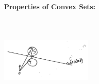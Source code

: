 \vspace{0.5cm}
\textbf{Properties of Convex Sets:}
\begin{marginfigure}
	\centering
	\includegraphics[width=1.8in,height=1.8in]{figures/ch08/figure1030_2.png}
\end{marginfigure}



